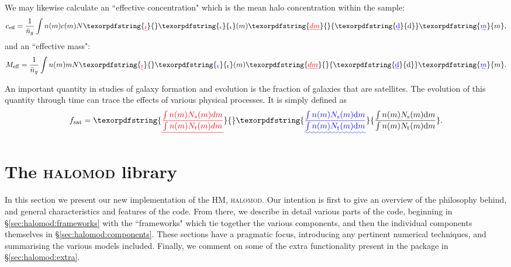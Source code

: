 \documentclass[5p,aas_macros]{elsarticle}
\providecommand{\DIFaddtex}[1]{{\protect\color{blue}\uwave{#1}}} %
\providecommand{\DIFdeltex}[1]{{\protect\color{red}\sout{#1}}}                      %
\providecommand{\DIFaddbegin}{} %
\providecommand{\DIFaddend}{} %
\providecommand{\DIFdelbegin}{} %
\providecommand{\DIFdelend}{} %
\providecommand{\DIFadd}[1]{\texorpdfstring{\DIFaddtex{#1}}{#1}} %
\providecommand{\DIFdel}[1]{\texorpdfstring{\DIFdeltex{#1}}{}} %
\begin{document}
We may likewise calculate an ``effective concentration" which is the mean halo concentration within the sample:
\begin{equation}
     c_\text{eff} = \frac{1}{\bar{n}_g}\int n(m)c(m)N\DIFdelbegin \DIFdel{_t}\DIFdelend \DIFaddbegin \DIFadd{_{\rm t}}\DIFaddend (m) \DIFdelbegin \DIFdel{dm}\DIFdelend \DIFaddbegin {\rm \DIFadd{d}}\DIFadd{m}\DIFaddend ,
\end{equation}
and an ``effective mass":
\begin{equation}
     M_\text{eff} = \frac{1}{\bar{n}_g}\int n(m)mN\DIFdelbegin \DIFdel{_t}\DIFdelend \DIFaddbegin \DIFadd{_{\rm t}}\DIFaddend (m) \DIFdelbegin \DIFdel{dm}\DIFdelend \DIFaddbegin {\rm \DIFadd{d}}\DIFadd{m}\DIFaddend .
\end{equation}

An important quantity in studies of galaxy formation and evolution is the fraction of galaxies that are satellites. The evolution of this quantity through time can trace the effects of various physical processes. It is simply defined as
\begin{equation}
    f_\text{sat} = \DIFdelbegin \DIFdel{\frac{\int n(m) N_s(m) dm}{\int n(m) N_t(m) dm}}\DIFdelend \DIFaddbegin \DIFadd{\frac{\int n(m) N_{\rm s}(m) {\rm d}m}{\int n(m) N_{\rm t}(m) {\rm d}m}}\DIFaddend .
\end{equation}



\section{The \textsc{halomod} library}
\label{sec:halomod}

In this section we present our new implementation of the HM, \textsc{halomod}. Our intention is first to give an overview of the philosophy behind, and general characteristics and features of the code. From there, we describe in detail various parts of the code, beginning in \S\ref{sec:halomod:frameworks} with the ``frameworks" which tie together the various components, and then the individual components themselves in \S\ref{sec:halomod:components}. These sections have a pragmatic focus, introducing any pertinent numerical techniques, and summarising the various models included. Finally, we comment on some of the extra functionality present in the package in \S\ref{sec:halomod:extra}.


 
\end{document}
